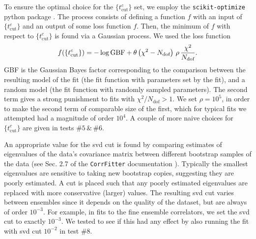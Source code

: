 To ensure the optimal choice for the $\{ t_{\text{cut}}^{c}\}$ set, we employ the \texttt{scikit-optimize} python package \cite{skopt}. The process consists of defining a function $f$ with an input of $\{ t_{\text{cut}}^{c}\}$ and an output of some loss function $f$. Then, the minimum of $f$ with respect to $\{ t_{\text{cut}}^{c}\}$ is found via a Gaussian process. We used the loss function
\begin{align}
  f(\{ t_{\text{cut}}^{c}\}) = - \log \text{GBF} + \theta\left(\chi^2 - N_{\text{dof}}\right) \,\rho\, {\chi^2\over N_{\text{dof}}}.
\end{align}
GBF is the Gaussian Bayes factor corresponding to the comparison between the resulting model of the fit (the fit function with parameters set by the fit), and a random model (the fit function with randomly sampled parameters). The second term gives a strong punishment to fits with $\chi^2/N_{\text{dof}} > 1$. We set $\rho=10^5$, in order to make the second term of comparable size of the first, which for typical fits we attempted had a magnitude of order $10^4$. A couple of more naive choices for $\{ t_{\text{cut}}^{c}\}$ are given in tests $\#5 \,\&\, \#6$.

An appropriate value for the svd cut is found by comparing estimates of eigenvalues of the data's covariance matrix between different bootstrap samples of the data (see Sec. 2.7 of the \texttt{CorrFitter} documentation \cite{CorrFitter}). Typically the smallest eigenvalues are sensitive to taking new bootstrap copies, suggesting they are poorly estimated. A cut is placed such that any poorly estimated eigenvalues are replaced with more conservative (larger) values. The resulting svd cut varies between ensembles since it depends on the quality of the dataset, but are always of order $10^{-3}$.
For example, in fits to the fine ensemble correlators, we set the svd cut to exactly $10^{-3}$. We tested to see if this had any effect by also running the fit with svd cut $10^{-2}$ in test \#8.


